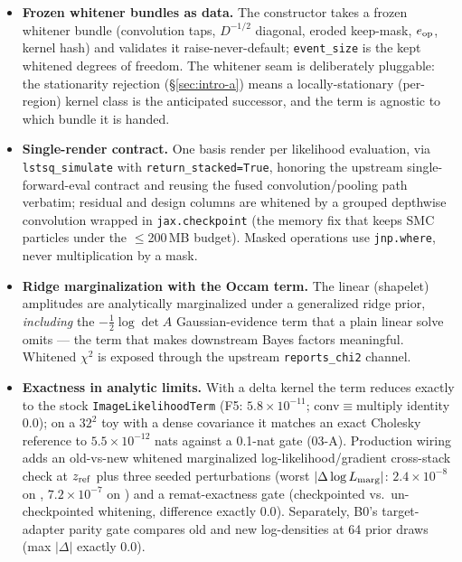 \begin{itemize}
\item \textbf{Frozen whitener bundles as data.} The constructor takes a
  frozen whitener bundle (convolution taps, $D^{-1/2}$ diagonal, eroded
  keep-mask, $e_{\mathrm{op}}$, kernel hash) and validates it
  raise-never-default; \texttt{event\_size} is the kept whitened degrees
  of freedom. The whitener seam is deliberately pluggable: the
  stationarity rejection (\S\ref{sec:intro-a}) means a locally-stationary
  (per-region) kernel class is the anticipated successor, and the term is
  agnostic to which bundle it is handed.
\item \textbf{Single-render contract.} One basis render per likelihood
  evaluation, via \texttt{lstsq\_simulate} with
  \texttt{return\_stacked=True}, honoring the upstream single-forward-eval
  contract and reusing the fused convolution/pooling path verbatim;
  residual and design columns are whitened by a grouped depthwise
  convolution wrapped in \texttt{jax.checkpoint} (the memory fix that
  keeps SMC particles under the $\le$200\,MB budget). Masked operations
  use \texttt{jnp.where}, never multiplication by a mask.
\item \textbf{Ridge marginalization with the Occam term.} The linear
  (shapelet) amplitudes are analytically marginalized under a generalized
  ridge prior, \emph{including} the $-\tfrac12\log\det A$
  Gaussian-evidence term that a plain linear solve omits --- the term that
  makes downstream Bayes factors meaningful. Whitened $\chi^2$ is exposed
  through the upstream \texttt{reports\_chi2} channel.
\item \textbf{Exactness in analytic limits.} With a delta kernel the
  term reduces exactly to the stock
  \texttt{Image\allowbreak Likelihood\allowbreak Term} (F5:
  $5.8\times10^{-11}$; conv$\equiv$multiply identity $0.0$); on a $32^2$
  toy with a dense covariance it matches an exact Cholesky reference to
  $5.5\times10^{-12}$ nats against a 0.1-nat gate
  (03-A). Production wiring
  adds an old-vs-new whitened marginalized log-likelihood/gradient
  cross-stack check at $z_{\rm ref}$ plus three seeded perturbations
  (worst $|\Delta\log L_{\rm marg}|$: $2.4\times10^{-8}$ on ,
  $7.2\times10^{-7}$ on
  ) and a
  remat-exactness gate (checkpointed vs.\ un-checkpointed whitening,
  difference exactly $0.0$). Separately,
  B0's target-adapter parity gate compares old and new log-densities at
  64 prior draws (max $|\Delta|$ exactly
  $0.0$).
\end{itemize}

